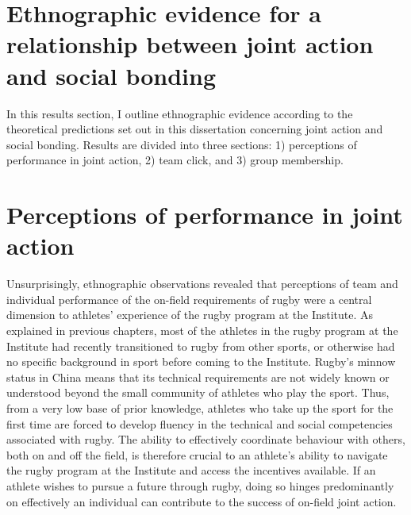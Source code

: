                                       \begin{CJK}{UTF8}{gbsn}

\section{Ethnographic evidence for a relationship between joint action and social bonding}


In this results section, I outline ethnographic evidence according to the theoretical predictions set out in this dissertation concerning joint action and social bonding. Results are divided into three sections: 1) perceptions of performance in joint action, 2) team click, and 3) group membership.






\section{Perceptions of performance in joint action}
Unsurprisingly, ethnographic observations revealed that perceptions of team and individual performance of the on-field requirements of rugby were a central dimension to athletes' experience of the rugby program at the Institute.  As explained in previous chapters, most of the athletes in the rugby program at the Institute had recently transitioned to rugby from other sports, or otherwise had no specific background in sport before coming to the Institute.  Rugby's minnow status in China means that its technical requirements are not widely known or understood beyond the small community of athletes who play the sport.  Thus, from a very low base of prior knowledge, athletes who take up the sport for the first time are forced to develop fluency in the technical and social competencies associated with rugby.  The ability to effectively coordinate behaviour with others, both on and off the field, is therefore crucial to an athlete's ability to navigate the rugby program at the Institute and access the incentives available.  If an athlete wishes to pursue a future through rugby, doing so hinges predominantly on effectively an individual can contribute to the success of on-field joint action.


\end{CJK}
